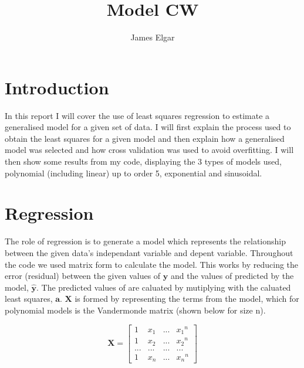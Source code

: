 \documentclass[]{article}
\title{Model CW}
\author{James Elgar}
\begin{document}
\maketitle

\section{Introduction}

In this report I will cover the use of least squares regression to estimate a
generalised model for a given set of data. I will first explain the process 
used to obtain the least squares for a given model and then explain how a
generalised model was selected and how cross validation was used to avoid overfitting. I will then show some results
from my code, displaying the 3 types of models used, polynomial (including
linear) up to order 5, exponential and sinusoidal.

\section{Regression}

The role of regression is to generate a model which represents the relationship
between the given data's independant variable and depent variable. Throughout
the code we used matrix form to calculate the model. This works by reducing the
error (residual) between the given values of $\boldsymbol{y}$ and the values of  predicted by the model,
$\hat{\boldsymbol{y}}$. The predicted values of  are caluated by mutiplying  with the
caluated least squares, $\boldsymbol{a}$. $\boldsymbol{X}$ is formed by representing the terms from the
model, which for polynomial models is the Vandermonde matrix (shown below for
size n). 

\begin{equation}
  \boldsymbol{X} = 
  \begin{bmatrix}
    1   & x_1   & ... & {x_1}^n     \\
    1   & {x_2} & ... & {x_2}^n  \\
    ... & ...   & ... & ...     \\
    1   & {x_n} & ... & {x_n}^n  
  \end{bmatrix}
\end{equation}
\end{document}
